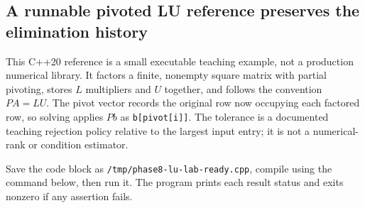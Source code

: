 \subsection{A runnable pivoted LU reference preserves the elimination history}\label{01-foundations-i-ch019-a-runnable-pivoted-lu-reference-preserves-the-elimination-history}

This C++20 reference is a small executable teaching example, not a production numerical library. It factors a finite, nonempty square matrix with partial pivoting, stores \(L\) multipliers and \(U\) together, and follows the convention \(PA=LU\). The pivot vector records the original row now occupying each factored row, so solving applies \(Pb\) as \texttt{b{[}pivot{[}i{]}{]}}. The tolerance is a documented teaching rejection policy relative to the largest input entry; it is not a numerical-rank or condition estimator.

Save the code block as \texttt{/tmp/phase8-lu-lab-ready.cpp}, compile using the command below, then run it. The program prints each result status and exits nonzero if any assertion fails.


